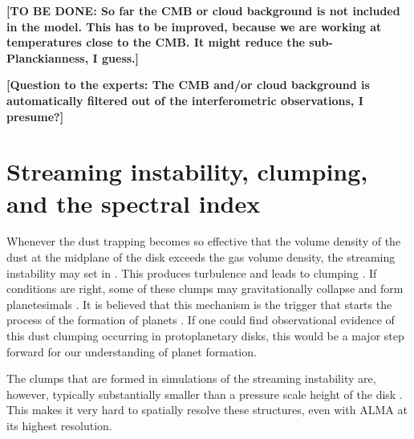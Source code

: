 \documentclass{aa}
\begin{document}
{\bf [TO BE DONE: So far the CMB or cloud background is not included in the model.
    This has to be improved, because we are working at temperatures close to the
    CMB. It might reduce the sub-Planckianness, I guess.]}

{\bf [Question to the experts: The CMB and/or cloud background is automatically
filtered out of the interferometric observations, I presume?]}


\section{Streaming instability, clumping, and the spectral index}
\label{sec-si-clump}
%
Whenever the dust trapping becomes so effective that the volume density of the
dust at the midplane of the disk exceeds the gas volume density, the streaming
instability may set in \citep{2005ApJ...620..459Y}. This produces turbulence and
leads to clumping \citep{2007ApJ...662..627J, 2008A&A...479..883L,
  2010ApJ...722.1437B}. If conditions are right, some of these clumps may
gravitationally collapse and form planetesimals \citep{2007Natur.448.1022J,
  2017ApJ...847L..12S, 2017A&A...597A..69S}. It is believed that this mechanism
is the trigger that starts the process of the formation of planets
\citep[see][for a review]{2014prpl.conf..547J}. If one could find observational
evidence of this dust clumping occurring in protoplanetary disks, this would
be a major step forward for our understanding of planet formation.

The clumps that are formed in simulations of the streaming instability are,
however, typically substantially smaller than a pressure scale height of the
disk \citep{2007ApJ...662..627J, 2013MNRAS.434.1460K}. This makes it very hard
to spatially resolve these structures, even with ALMA at its highest resolution.
\end{document}
